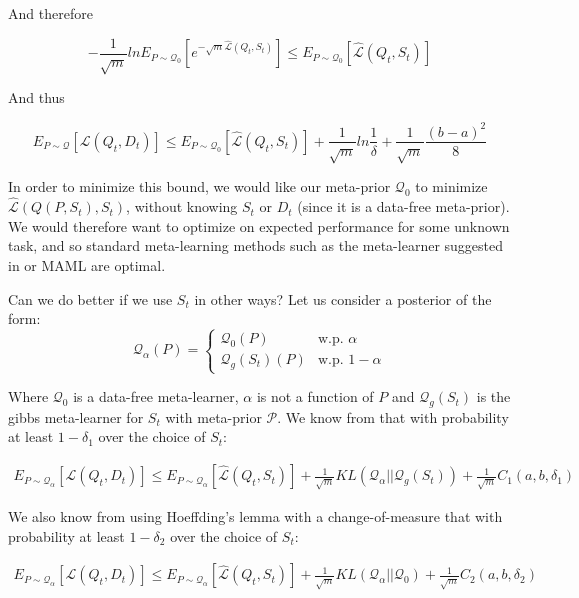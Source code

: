 \documentclass[letterpaper]{article}
\theoremstyle{definition}
\begin{document}
And therefore 

$$-\frac{1}{\sqrt{m}}ln E_{P\sim \mathcal{Q}_0} \left [e^{-\sqrt{m}\hat{\mathcal{L}}(Q_t, S_t)}\right ] \leq E_{P\sim \mathcal{Q}_0} \left [\hat{\mathcal{L}}(Q_t, S_t)\right ]$$

And thus 

$$  E_{P\sim \mathcal{Q}} \left [\mathcal{L}(Q_t, D_t)\right ] \leq E_{P\sim \mathcal{Q}_0} \left [\hat{\mathcal{L}}(Q_t, S_t)\right ] +\frac{1}{\sqrt{m}}ln\frac{1}{\delta} + \frac{1}{\sqrt{m}}\frac{(b-a)^2}{8} $$


In order to minimize this bound, we would like our meta-prior $\mathcal{Q}_0$ to minimize $\hat{\mathcal{L}}(Q(P, S_t), S_t)$, without knowing $S_t$ or $D_t$ (since it is a data-free meta-prior). We would therefore want to optimize on expected performance for some unknown task, and so standard meta-learning methods such as the meta-learner suggested in \cite{Rothfuss2020} or MAML \citep{Finn2017} are optimal.

Can we do better if we use $S_t$ in other ways? 
Let us consider a posterior of the form:
$$ \mathcal{Q}_\alpha(P) = \begin{cases}
\mathcal{Q}_0(P) & \text{w.p. } \alpha\\
\mathcal{Q}_{g}(S_t)(P)  &\text{w.p. } 1-\alpha
\end{cases} $$

Where $\mathcal{Q}_0$ is a data-free meta-learner, $\alpha$ is not a function of $P$ and $\mathcal{Q}_{g}(S_t)$ is the gibbs meta-learner for $S_t$ with meta-prior $\mathcal{P}$.
We know from \cite{Rivasplata2020} that with probability at least $1-\delta_1$ over the choice of $S_t$:

\begin{equation*}
\begin{split}
E_{P\sim \mathcal{Q}_\alpha} \left [\mathcal{L}(Q_t, D_t)\right ] \leq  E_{P\sim \mathcal{Q}_\alpha} \left [\hat{\mathcal{L}}(Q_t, S_t)\right ] + \frac{1}{\sqrt{m}}KL(\mathcal{Q}_\alpha||\mathcal{Q}_{g}(S_t)) + \frac{1}{\sqrt{m}}C_1(a,b, \delta_1)
\end{split}
\end{equation*}

We also know from using Hoeffding's lemma with a change-of-measure that with probability at least $1-\delta_2$ over the choice of $S_t$:

\begin{equation*}
\begin{split}
E_{P\sim \mathcal{Q}_\alpha} \left [\mathcal{L}(Q_t, D_t)\right ] \leq  E_{P\sim \mathcal{Q}_\alpha} \left [\hat{\mathcal{L}}(Q_t, S_t)\right ] + \frac{1}{\sqrt{m}}KL(\mathcal{Q}_\alpha||\mathcal{Q}_0) + \frac{1}{\sqrt{m}}C_2(a,b,\delta_2)
\end{split}
\end{equation*}
\end{document}
